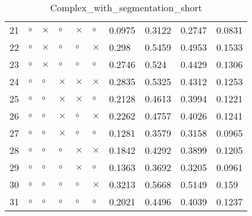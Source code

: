 \begin{table}[H]
\begin{tabular}{|P{0.7cm}|P{1.3cm}P{1.3cm}P{1.3cm}P{1.3cm}P{1.3cm}|P{1.1cm}P{1.1cm}P{1.1cm}P{1.1cm}|}
  21 &  $\circ$ & $\times$ &  $\circ$ & $\times$ &     $\circ$ &          0.0975 &          0.3122 &          0.2747 &          0.0831 \\
  22 &  $\circ$ & $\times$ &  $\circ$ &  $\circ$ &    $\times$ &           0.298 &          0.5459 &          0.4953 &          0.1533 \\
  23 &  $\circ$ & $\times$ &  $\circ$ &  $\circ$ &     $\circ$ &          0.2746 &           0.524 &          0.4429 &          0.1306 \\
  24 &  $\circ$ &  $\circ$ & $\times$ & $\times$ &    $\times$ &          0.2835 &          0.5325 &          0.4312 &          0.1253 \\
  25 &  $\circ$ &  $\circ$ & $\times$ & $\times$ &     $\circ$ &          0.2128 &          0.4613 &          0.3994 &          0.1221 \\
  26 &  $\circ$ &  $\circ$ & $\times$ &  $\circ$ &    $\times$ &          0.2262 &          0.4757 &          0.4026 &          0.1241 \\
  27 &  $\circ$ &  $\circ$ & $\times$ &  $\circ$ &     $\circ$ &          0.1281 &          0.3579 &          0.3158 &          0.0965 \\
  28 &  $\circ$ &  $\circ$ &  $\circ$ & $\times$ &    $\times$ &          0.1842 &          0.4292 &          0.3899 &          0.1205 \\
  29 &  $\circ$ &  $\circ$ &  $\circ$ & $\times$ &     $\circ$ &          0.1363 &          0.3692 &          0.3205 &          0.0961 \\
  30 &  $\circ$ &  $\circ$ &  $\circ$ &  $\circ$ &    $\times$ &          0.3213 &          0.5668 &          0.5149 &           0.159 \\
  31 &  $\circ$ &  $\circ$ &  $\circ$ &  $\circ$ &     $\circ$ &          0.2021 &          0.4496 &          0.4039 &          0.1237 \\
\hline
\end{tabular}
\caption{Complex_with_segmentation_short}
\label{tab:}
\end{table}
